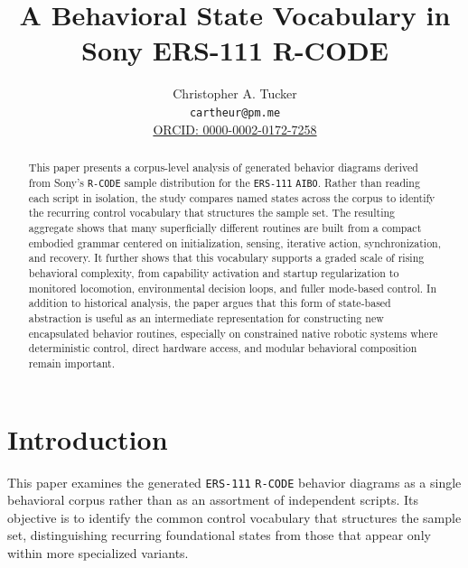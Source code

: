 \documentclass[11pt]{article}
\title{A Behavioral State Vocabulary in Sony ERS-111 R-CODE}
\author{Christopher A. Tucker\\
\small \texttt{cartheur@pm.me}\\
\small \href{https://orcid.org/0000-0002-0172-7258}{ORCID: 0000-0002-0172-7258}}
\date{}
\begin{document}
\maketitle

\begin{abstract}
This paper presents a corpus-level analysis of generated behavior
diagrams derived from Sony's \texttt{R-CODE} sample distribution for the
\texttt{ERS-111} \texttt{AIBO}. Rather than reading each script in
isolation, the study compares named states across the corpus to
identify the recurring control vocabulary that structures the sample
set. The resulting aggregate shows that many superficially different
routines are built from a compact embodied grammar centered on
initialization, sensing, iterative action, synchronization, and
recovery. It further shows that this vocabulary supports a graded scale
of rising behavioral complexity, from capability activation and startup
regularization to monitored locomotion, environmental decision loops,
and fuller mode-based control. In addition to historical analysis, the
paper argues that this form of state-based abstraction is useful as an
intermediate representation for constructing new encapsulated behavior
routines, especially on constrained native robotic systems where
deterministic control, direct hardware access, and modular behavioral
composition remain important.
\end{abstract}

\section*{Introduction}

This paper examines the generated \texttt{ERS-111} \texttt{R-CODE}
behavior diagrams as a single behavioral corpus rather than as an
assortment of independent scripts. Its objective is to identify the
common control vocabulary that structures the sample set,
distinguishing recurring foundational states from those that appear
only within more specialized variants.
\end{document}
